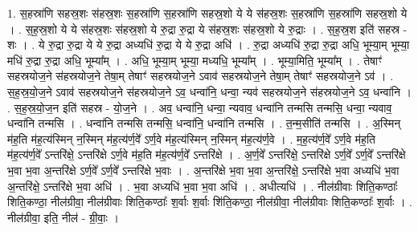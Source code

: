 \documentclass[17pt]{extarticle}
\begin{document}
1. स॒हस्रा॑णि सहस्र॒शः स॑हस्र॒शः स॒हस्रा॑णि स॒हस्रा॑णि सहस्र॒शो ये ये स॑हस्र॒शः स॒हस्रा॑णि स॒हस्रा॑णि सहस्र॒शो ये । . स॒ह॒स्र॒शो ये ये स॑हस्र॒शः स॑हस्र॒शो ये रु॒द्रा रु॒द्रा ये स॑हस्र॒शः स॑हस्र॒शो ये रु॒द्राः । . स॒ह॒स्र॒श इति॑ सहस्र - शः । . ये रु॒द्रा रु॒द्रा ये ये रु॒द्रा अध्यधि॑ रु॒द्रा ये ये रु॒द्रा अधि॑ । . रु॒द्रा अध्यधि॑ रु॒द्रा रु॒द्रा अधि॒ भूम्या॒म् भूम्या॒ मधि॑ रु॒द्रा रु॒द्रा अधि॒ भूम्या᳚म् । . अधि॒ भूम्या॒म् भूम्या॒ मध्यधि॒ भूम्या᳚म् । . भूम्या॒मिति॒ भूम्या᳚म् । . तेषाꣳ॑ सहस्रयोज॒ने स॑हस्रयोज॒ने तेषा॒म् तेषाꣳ॑ सहस्रयोज॒ने ऽवाव॑ सहस्रयोज॒ने तेषा॒म् तेषाꣳ॑ सहस्रयोज॒ने ऽव॑ । . स॒ह॒स्र॒यो॒ज॒ने ऽवाव॑ सहस्रयोज॒ने स॑हस्रयोज॒ने ऽव॒ धन्वा॑नि॒ धन्वा॒ न्यव॑ सहस्रयोज॒ने स॑हस्रयोज॒ने ऽव॒ धन्वा॑नि । . स॒ह॒स्र॒यो॒ज॒न इति॑ सहस्र - यो॒ज॒ने । . अव॒ धन्वा॑नि॒ धन्वा॒ न्यवाव॒ धन्वा॑नि तन्मसि तन्मसि॒ धन्वा॒ न्यवाव॒ धन्वा॑नि तन्मसि । . धन्वा॑नि तन्मसि तन्मसि॒ धन्वा॑नि॒ धन्वा॑नि तन्मसि । . त॒न्म॒सीति॑ तन्मसि । . अ॒स्मिन् म॑ह॒ति म॑ह॒त्य॑स्मिन् न॒स्मिन् म॑ह॒त्य॑र्ण॒वे᳚ ऽर्ण॒वे म॑ह॒त्य॑स्मिन् न॒स्मिन् म॑ह॒त्य॑र्ण॒वे । . म॒ह॒त्य॑र्ण॒वे᳚ ऽर्ण॒वे म॑ह॒ति म॑ह॒त्य॑र्ण॒वे᳚ ऽन्तरि॑क्षे॒ ऽन्तरि॑क्षे ऽर्ण॒वे म॑ह॒ति 
म॑ह॒त्य॑र्ण॒वे᳚ ऽन्तरि॑क्षे । . अ॒र्ण॒वे᳚ ऽन्तरि॑क्षे॒ ऽन्तरि॑क्षे ऽर्ण॒वे᳚ ऽर्ण॒वे᳚ ऽन्तरि॑क्षे भ॒वा भ॒वा अ॒न्तरि॑क्षे ऽर्ण॒वे᳚ ऽर्ण॒वे᳚ ऽन्तरि॑क्षे भ॒वाः । . अ॒न्तरि॑क्षे भ॒वा भ॒वा अ॒न्तरि॑क्षे॒ ऽन्तरि॑क्षे भ॒वा अध्यधि॑ भ॒वा अ॒न्तरि॑क्षे॒ ऽन्तरि॑क्षे भ॒वा अधि॑ । . भ॒वा अध्यधि॑ भ॒वा भ॒वा अधि॑ । . अधीत्यधि॑ । . नील॑ग्रीवाः शिति॒कण्ठाः᳚ शिति॒कण्ठा॒ नील॑ग्रीवा॒ नील॑ग्रीवाः शिति॒कण्ठाः᳚ श॒र्वाः श॒र्वाः शि॑ति॒कण्ठा॒ नील॑ग्रीवा॒ नील॑ग्रीवाः शिति॒कण्ठाः᳚ श॒र्वाः । . नील॑ग्रीवा॒ इति॒ नील॑ - ग्री॒वाः॒ । \newline
\end{document}
